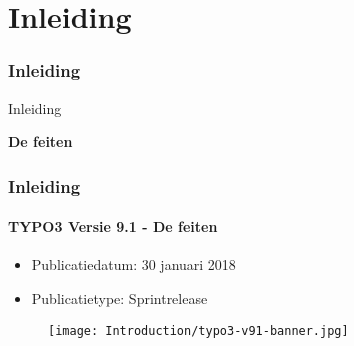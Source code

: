 %

\section{Inleiding}
\begin{frame}[fragile]
	\frametitle{Inleiding}

	\begin{center}\huge{Inleiding}\end{center}
	\begin{center}\huge{\color{typo3darkgrey}\textbf{De feiten}}\end{center}

\end{frame}

\begin{frame}[fragile]
	\frametitle{Inleiding}
	\framesubtitle{TYPO3 Versie 9.1 - De feiten}

	\begin{itemize}
		\item Publicatiedatum: 30 januari 2018
		\item Publicatietype: Sprintrelease
	\end{itemize}

	\begin{figure}
		\texttt{[image: Introduction/typo3-v91-banner.jpg]}
	\end{figure}

\end{frame}

